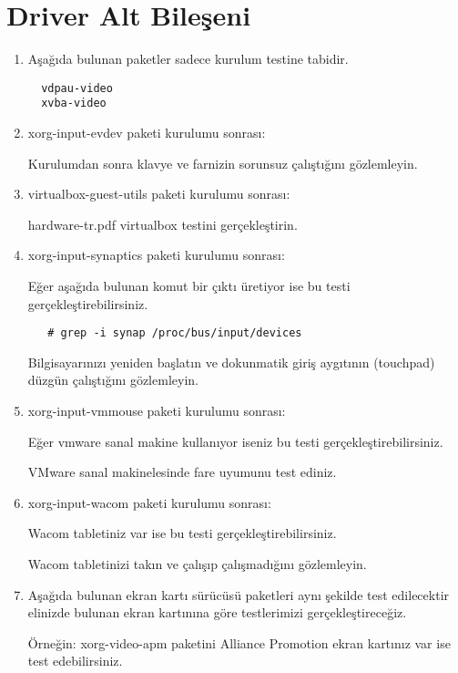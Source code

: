 \documentclass[a4paper,10pt]{article}
\begin{document}
\section{Driver Alt Bileşeni}
\begin{enumerate}
\item Aşağıda bulunan paketler sadece kurulum testine tabidir.
  \begin{verbatim}
  vdpau-video
  xvba-video   
  \end{verbatim}

  \item xorg-input-evdev paketi kurulumu sonrası:

Kurulumdan sonra klavye ve farnizin sorunsuz çalıştığını gözlemleyin.

  \item virtualbox-guest-utils paketi kurulumu sonrası:

hardware-tr.pdf virtualbox testini gerçekleştirin.

  \item xorg-input-synaptics  paketi kurulumu sonrası:

Eğer aşağıda bulunan komut bir çıktı üretiyor ise bu testi gerçekleştirebilirsiniz.
  \begin{verbatim}
   # grep -i synap /proc/bus/input/devices
  \end{verbatim}

Bilgisayarınızı yeniden başlatın ve dokunmatik giriş aygıtının (touchpad) düzgün çalıştığını gözlemleyin.

\item xorg-input-vmmouse paketi kurulumu sonrası:

Eğer vmware sanal makine kullanıyor iseniz bu testi gerçekleştirebilirsiniz. 

VMware sanal makinelesinde fare uyumunu test ediniz.

\item xorg-input-wacom paketi kurulumu sonrası:

Wacom tabletiniz var ise bu testi gerçekleştirebilirsiniz.

Wacom tabletinizi takın ve çalışıp çalışmadığını gözlemleyin.

\item Aşağıda bulunan ekran kartı sürücüsü paketleri aynı şekilde test edilecektir elinizde bulunan ekran kartınına göre testlerimizi gerçekleştireceğiz. 

Örneğin: xorg-video-apm paketini Alliance Promotion ekran kartınız var ise test edebilirsiniz.


\end{enumerate}
\end{document}
